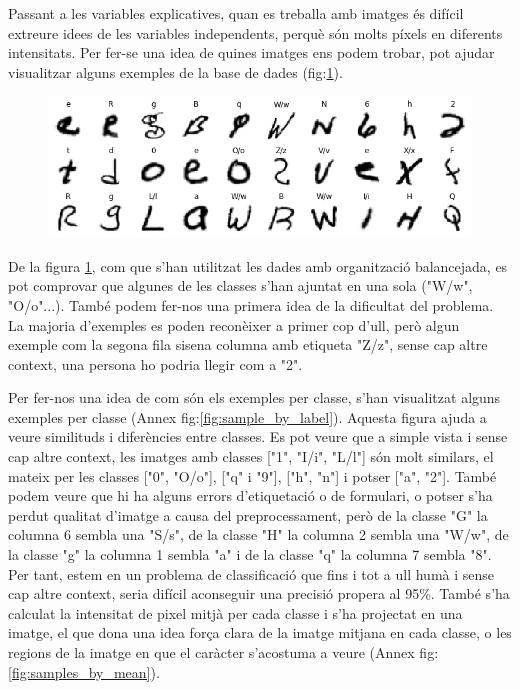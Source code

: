 \documentclass[12pt, spanish]{article}
\begin{document}
Passant a les variables explicatives, quan es treballa amb imatges és difícil extreure idees de les variables independents, perquè són molts píxels en diferents intensitats. Per fer-se una idea de quines imatges ens podem trobar,  pot ajudar visualitzar alguns exemples de la base de dades (fig:\ref{fig:sample_random}).

\begin{figure}[hbt!]
\centering
	\includegraphics[width=1\textwidth]{images/samples_balanced.png}
	\label{fig:sample_random}
\end{figure}

De la figura \ref{fig:sample_random}, com que s'han utilitzat les dades amb organització balancejada, es pot comprovar que algunes  de les classes s'han ajuntat en una sola ("W/w", "O/o"...). També podem fer-nos una primera idea de la dificultat del problema. La majoria d'exemples es poden reconèixer a primer cop d'ull, però algun exemple com la segona fila sisena columna amb etiqueta "Z/z", sense cap altre context, una persona ho podria llegir com a "2".

Per fer-nos una idea de com són els exemples per classe, s'han visualitzat alguns exemples per classe (Annex fig:\ref{fig:sample_by_label}). Aquesta figura ajuda a veure similituds i diferències entre classes. Es pot veure que a simple vista i sense cap altre context, les imatges amb classes ["1", "I/i", "L/l"] són molt similars, el mateix per les classes ["0", "O/o"], ["q" i "9"], ["h", "n"] i potser ["a", "2"]. També podem veure que hi ha alguns errors d'etiquetació o de formulari, o potser s'ha perdut qualitat d'imatge a causa del preprocessament, però de la classe "G" la columna 6 sembla una "S/s", de la classe "H" la columna 2 sembla una "W/w", de la classe "g" la columna 1 sembla "a" i de la classe "q" la columna 7 sembla "8". Per tant, estem en un problema de classificació que fins i tot a ull humà i sense cap altre context, seria difícil aconseguir una precisió propera al 95\%. També s'ha calculat la intensitat de pixel mitjà per cada classe i s'ha projectat en una imatge, el que dona una idea força clara de la imatge mitjana en cada classe, o les regions de la imatge en que el caràcter s'acostuma a veure (Annex fig:\ref{fig:samples_by_mean}).
\end{document}
